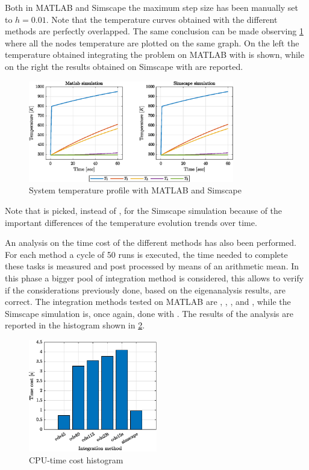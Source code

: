 \documentclass[11pt,a4paper,oneside]{article}
\begin{document}
Both in MATLAB and Simscape the maximum step size has been manually set to $h=0.01$.
Note that the temperature curves obtained with the different methods are perfectly overlapped.
The same conclusion can be made observing \cref{fig:ex1_tempCompare} where all the nodes temperature are plotted on the same graph.
On the left the temperature obtained integrating the problem on MATLAB with  is shown, while on the right the results obtained on Simscape with  are reported.
\begin{figure}[H]
    \centering
    \includegraphics*[width=0.8\textwidth, keepaspectratio]{Figures/ex1_tempCompare.eps}
    \caption[]{\label{fig:ex1_tempCompare} System temperature profile with MATLAB and Simscape}
\end{figure}

Note that  is picked, instead of , for the Simscape simulation because of the important differences of the temperature evolution trends over time.

An analysis on the time cost of the different methods has also been performed.
For each method a cycle of 50 runs is executed, the time needed to complete these tasks is measured and post processed by means of an arithmetic mean.
In this phase a bigger pool of integration method is considered, this allows to verify if the considerations previously done, based on the eigenanalysis results, are correct.
The integration methods tested on MATLAB are , , ,  and , while the Simscape simulation is, once again, done with .
The results of the analysis are reported in the histogram shown in \cref{fig:ex1_CPUtime}.
\begin{figure}[H]
    \centering
    \includegraphics*[width=0.5\textwidth, keepaspectratio]{Figures/ex1_CPUtime.eps}
    \caption[]{\label{fig:ex1_CPUtime} CPU-time cost histogram}
\end{figure}
\end{document}
